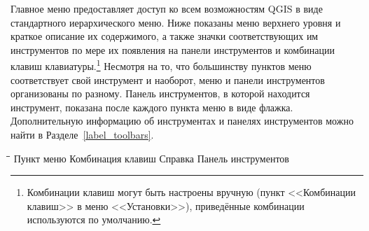 Главное меню предоставляет доступ ко всем возможностям QGIS в виде
стандартного иерархического меню. Ниже показаны меню верхнего уровня
и краткое описание их содержимого, а также значки соответствующих им
инструментов по мере их появления на панели инструментов и комбинации
клавиш клавиатуры.\footnote{Комбинации клавиш могут быть настроены вручную (пункт
<<Комбинации клавиш>> в меню <<Установки>>), приведённые комбинации используются
по умолчанию.}
Несмотря на то, что большинству пунктов меню соответствует свой инструмент
и наоборот, меню и панели инструментов организованы по разному.
Панель инструментов, в которой находится инструмент, показана после каждого
пункта меню в виде флажка. Дополнительную информацию об инструментах
и панелях инструментов можно найти в Разделе~\ref{label_toolbars}.

\begin{tabbing}
\hspace{5.5cm}\=\hspace{3cm}\=\hspace{3.5cm}\= \kill
\hspace{1cm} Пункт меню \> Комбинация клавиш \> Справка \> Панель инструментов\\
\end{tabbing}

